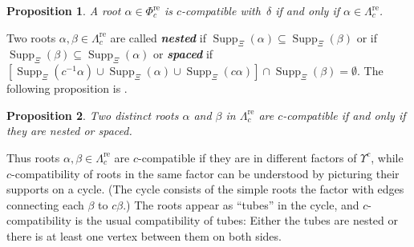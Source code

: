 \documentclass{amsart}
\newtheorem{proposition}{Proposition}[section]
\theoremstyle{definition}
\theoremstyle{remark}
\numberwithin{equation}{section}
\newcommand{\newword}[1]{\textbf{\emph{#1}}}
\newcommand{\0}{{\mathbf{0}}}
\newcommand{\Fan}{\operatorname{Fan}}
\newcommand{\re}{\mathrm{re}}
\newcommand{\fin}{\mathrm{fin}}
\newcommand{\RSChar}{\Phi}
\newcommand{\RS}{\RSChar}
\newcommand{\RSpos}{\RS^+}
\newcommand{\RSfin}{\RS_\fin}
\newcommand{\SimplesChar}{\Pi}
\newcommand{\Simples}{\SimplesChar}
\newcommand{\RSTChar}{\Upsilon}
\newcommand{\RST}[1]{\RSTChar^{#1}}
\newcommand{\SimplesTChar}{\Xi}
\newcommand{\SuppT}{\operatorname{Supp}_\SimplesTChar}
\newcommand{\AP}[1]{\RS_{#1}}
\newcommand{\APre}[1]{\AP{#1}^\re}
\newcommand{\APTChar}{\Lambda}
\newcommand{\APT}[1]{\APTChar_{#1}}
\newcommand{\APTre}[1]{\APT{#1}^\re}
\begin{document}
\begin{proposition}\label{delta c compat}
A root $\alpha\in\APre{c}$ is $c$-compatible with~$\delta$ if and only if $\alpha\in\APTre{c}$.
\end{proposition}

Two roots $\alpha,\beta\in\APTre{c}$ are called \newword{nested} if $\SuppT(\alpha)\subseteq\SuppT(\beta)$ or if $\SuppT(\beta)\subseteq\SuppT(\alpha)$ or \newword{spaced} if $[\SuppT(c^{-1}\alpha)\cup\SuppT(\alpha)\cup\SuppT(c\alpha)]\cap\SuppT(\beta)=\emptyset$.
The following proposition is \cite[Proposition~5.12]{affdenom}.

\begin{proposition}\label{compatible in tubes}
Two distinct roots $\alpha$ and $\beta$ in $\APTre{c}$ are $c$-compatible if and only if they are nested or spaced.
\end{proposition}

Thus roots $\alpha,\beta\in\APTre{c}$ are $c$-compatible if they are in different factors of $\RST{c}$, while
$c$-compatibility of roots in the same factor can be understood by picturing their supports on a cycle.
(The cycle consists of the simple roots the factor with edges connecting each $\beta$ to $c\beta$.)
The roots appear as ``tubes'' in the cycle, and $c$-compatibility is the usual compatibility of tubes:
Either the tubes are nested or there is at least one vertex between them on both sides.

\end{document}
